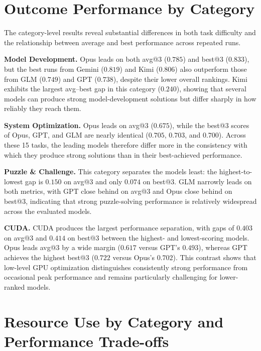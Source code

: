 \appendix

\section{Outcome Performance by Category}
\label{app:outcome_by_category}



The category-level results reveal substantial differences in both task difficulty and the relationship between average and best performance across repeated runs.

\textbf{Model Development.}
Opus leads on both avg@3 ($0.785$) and best@3 ($0.833$), but the best runs from Gemini ($0.819$) and Kimi ($0.806$) also outperform those from GLM ($0.749$) and GPT ($0.738$), despite their lower overall rankings.
Kimi exhibits the largest avg--best gap in this category ($0.240$), showing that several models can produce strong model-development solutions but differ sharply in how reliably they reach them.


\textbf{System Optimization.}
Opus leads on avg@3 ($0.675$), while the best@3 scores of Opus, GPT, and GLM are nearly identical ($0.705$, $0.703$, and $0.700$).
Across these 15 tasks, the leading models therefore differ more in the consistency with which they produce strong solutions than in their best-achieved performance.

\textbf{Puzzle \& Challenge.}
This category separates the models least: the highest-to-lowest gap is $0.150$ on avg@3 and only $0.074$ on best@3.
GLM narrowly leads on both metrics, with GPT close behind on avg@3 and Opus close behind on best@3, indicating that strong puzzle-solving performance is relatively widespread across the evaluated models.

\textbf{CUDA.}
CUDA produces the largest performance separation, with gaps of $0.403$ on avg@3 and $0.414$ on best@3 between the highest- and lowest-scoring models.
Opus leads avg@3 by a wide margin ($0.617$ versus GPT's $0.493$), whereas GPT achieves the highest best@3 ($0.722$ versus Opus's $0.702$).
This contrast shows that low-level GPU optimization distinguishes consistently strong performance from occasional peak performance and remains particularly challenging for lower-ranked models.



\section{Resource Use by Category and Performance Trade-offs}
\label{app:resource_by_category}

